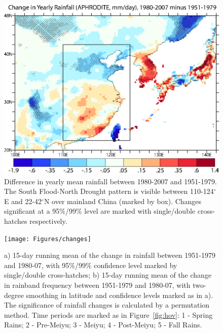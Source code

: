 \documentclass{ametsoc}
\begin{document}
\begin{figure}
\centering
\noindent\includegraphics[width=36pc]{Figures/changes_2d_nojet}
\caption{Difference in yearly mean rainfall between 1980-2007 and 1951-1979. The South Flood-North Drought pattern is visible between 110-124$^{\circ}$E and 22-42$^{\circ}$N over mainland China (marked by box). Changes significant at a 95\%/99\% level are marked with single/double cross-hatches respectively.}
\label{fig:f31}
\end{figure}

\begin{figure}[htbp]
\centering
\noindent\texttt{[image: Figures/changes]}
\caption{a) 15-day running mean of the change in rainfall between 1951-1979 and 1980-07, with 95\%/99\% confidence level marked by single/double cross-hatches; b) 15-day running mean of the change in rainband frequency between 1951-1979 and 1980-07, with two-degree smoothing in latitude and confidence levels marked as in a). The significance of rainfall changes is calculated by a permutation method. Time periods are marked as in Figure~\ref{fig:hov}: 1 - Spring Rains; 2 - Pre-Meiyu; 3 - Meiyu; 4 - Post-Meiyu; 5 - Fall Rains.}
\label{fig:changes}
\end{figure}
\end{document}
